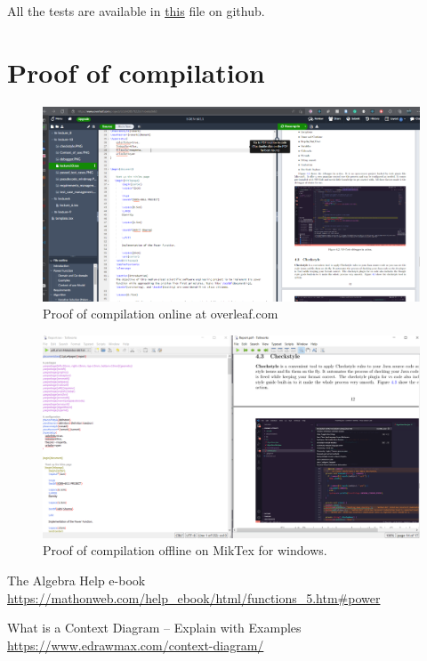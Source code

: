 \documentclass[11pt,a4paper]{report}
\theoremstyle{definition}
\theoremstyle{remark}
\begin{document}
    All the tests are available in \href{https://github.com/akhil-sharma/soen6011-eternity/blob/main/src/AlgorithmsTest.java}{this} file on github.
    
    \appendix
        \chapter{Proof of compilation}
            \begin{figure}[htbp]
                \centering
                \includegraphics[width=\linewidth]{proof_of_compilation_online.PNG}
                \caption{Proof of compilation online at overleaf.com}
                \label{fig:proof_of_compilation_online}
            \end{figure}
            
            \begin{figure}[htbp]
                \centering
                \includegraphics[width=\linewidth]{proof_of_compilation_offline.PNG}
                \caption{Proof of compilation offline on MikTex for windows.}
                \label{fig:proof_of_compilation_offline}
            \end{figure}
    
    \begin{thebibliography}{}
       The Algebra Help e-book
       \url{https://mathonweb.com/help_ebook/html/functions_5.htm#power}
        
        What is a Context Diagram – Explain with Examples
        \url{https://www.edrawmax.com/context-diagram/}
        
    
    \end{thebibliography}
    
\end{document}
